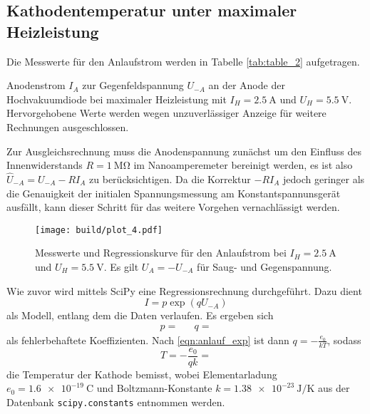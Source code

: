 \newpage
\subsection{Kathodentemperatur unter maximaler Heizleistung}

Die Messwerte für den Anlaufstrom werden in Tabelle \ref{tab:table_2} aufgetragen. 

\begin{table}[H]
	\caption{Anodenstrom $I_A$ zur Gegenfeldspannung $U_{-A}$ an der Anode der Hochvakuumdiode bei maximaler Heizleistung mit
			 $I_H = \qty{2.5}{\ampere}$ und $U_H = \qty{5.5}{\volt}$. Hervorgehobene Werte werden wegen unzuverlässiger Anzeige
			 für weitere Rechnungen ausgeschlossen.}
	\centering
	
	\label{tab:table_2}
\end{table}

Zur Ausgleichsrechnung muss die Anodenspannung zunächst um den Einfluss des Innenwiderstands $R = \qty{1}{\mega\ohm}$ im
Nanoamperemeter bereinigt werden, es ist also $\hat U_{-A} = U_{-A} - RI_A$ zu berücksichtigen. Da die Korrektur $-RI_A$ jedoch
geringer als die Genauigkeit der initialen Spannungsmessung am Konstantspannunsgerät ausfällt, kann dieser Schritt für das weitere
Vorgehen vernachlässigt werden.

\begin{figure}[H]
	\texttt{[image: build/plot\_4.pdf]}
	\caption{Messwerte und Regressionskurve für den Anlaufstrom bei $I_H = \qty{2.5}{\ampere}$ und $U_H = \qty{5.5}{\volt}$. Es gilt
			 $U_A = -U_{-A}$ für Saug- und Gegenspannung.}
	\label{fig:plot_4}
\end{figure}

Wie zuvor wird mittels SciPy \cite{scipy} eine Regressionsrechnung durchgeführt. Dazu dient
\begin{equation*}
	I = p \exp(q U_{-A})
\end{equation*}
als Modell, entlang dem die Daten verlaufen. Es ergeben sich
\begin{align*}
	p =  && q = 
\end{align*}
als fehlerbehaftete Koeffizienten. Nach \eqref{eqn:anlauf_exp} ist dann $q = -\frac{e_0}{kT}$, sodass
\begin{equation*}
	T = -\frac{e_0}{qk} = 
\end{equation*}
die Temperatur der Kathode bemisst, wobei Elementarladung $e_0 = \qty{1.6e-19}{\coulomb}$ und Boltzmann-Konstante
$k = \qty{1.38e-23}{\joule\per\kelvin}$ aus der Datenbank \verb+scipy.constants+ entnommen werden.

